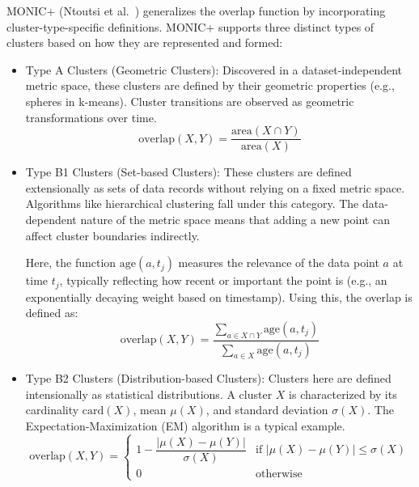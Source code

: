\textsc{MONIC+} (Ntoutsi et al.~\cite{monic_plus}) generalizes the overlap function by incorporating cluster-type-specific
definitions. MONIC+ supports three distinct types of clusters based on how they are represented and formed:
\begin{itemize}
    \item Type A Clusters (Geometric Clusters): Discovered in a dataset-independent
          metric space, these clusters are defined by their geometric properties (e.g.,
          spheres in k-means). Cluster transitions are observed as geometric
          transformations over time.
          \begin{equation}
              \text{overlap}(X,Y) = \frac{\text{area}(X \cap Y)}{\text{area}(X)}
          \end{equation}
    \item Type B1 Clusters (Set-based Clusters): These clusters are defined extensionally
          as sets of data records without relying on a fixed metric space. Algorithms
          like hierarchical clustering fall under this category. The data-dependent
          nature of the metric space means that adding a new point can affect cluster
          boundaries indirectly.

          Here, the function $\text{age}(a, t_j)$ measures the relevance of the data
          point $a$ at time $t_j$, typically reflecting how recent or important the point
          is (e.g., an exponentially decaying weight based on timestamp). Using this, the
          overlap is defined as:
          \begin{equation}
              \text{overlap}(X,Y) = \frac{\sum_{a \in X \cap Y} \text{age}(a, t_j)}{\sum_{a \in X} \text{age}(a, t_j)}
          \end{equation}
    \item Type B2 Clusters (Distribution-based Clusters): Clusters here are defined
          intensionally as statistical distributions. A cluster $X$ is characterized by
          its cardinality $\text{card}(X)$, mean $\mu(X)$, and standard deviation
          $\sigma(X)$. The Expectation-Maximization (EM) algorithm is a typical example.
          \begin{equation}
              \text{overlap}(X, Y) =
              \begin{cases}
                  1 - \dfrac{|\mu(X) - \mu(Y)|}{\sigma(X)} & \text{if } |\mu(X) - \mu(Y)| \leq \sigma(X) \\
                  0                                        & \text{otherwise}
              \end{cases}
          \end{equation}
\end{itemize}

